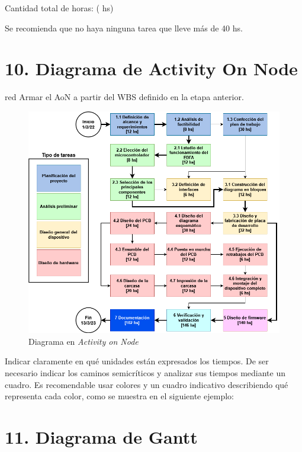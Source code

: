 \documentclass[
11pt, %
codirector, %
]{charter}
\begin{document}
Cantidad total de horas: ( hs)

Se recomienda que no haya ninguna tarea que lleve más de 40 hs.

\section{10. Diagrama de Activity On Node}
\label{sec:AoN}

\begin{consigna}{red}
Armar el AoN a partir del WBS definido en la etapa anterior. 



\end{consigna}

\begin{figure}[htpb]
\centering 
\includegraphics[width=.8\textwidth]{./Figuras/AoN.png}
\caption{Diagrama en \textit{Activity on Node}}
\label{fig:AoN}
\end{figure}

Indicar claramente en qué unidades están expresados los tiempos.
De ser necesario indicar los caminos semicríticos y analizar sus tiempos mediante un cuadro.
Es recomendable usar colores y un cuadro indicativo describiendo qué representa cada color, como se muestra en el siguiente ejemplo:



\section{11. Diagrama de Gantt}
\label{sec:gantt}
\end{document}

